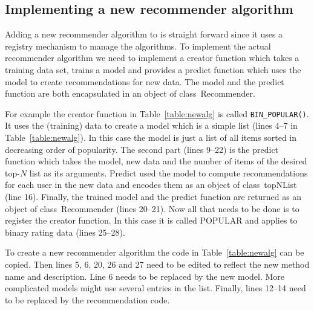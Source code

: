 \documentclass[nojss]{jss}
\newcommand{\class}[1]{\mbox{\textsf{#1}}}
\newcommand{\func}[1]{\mbox{\texttt{#1()}}}
\begin{document}

\subsection{Implementing a new recommender algorithm}

Adding a new recommender algorithm to  
is straight forward since
it uses a registry mechanism to manage the algorithms.
To implement the actual recommender algorithm
we need to implement a creator function which takes a training data set,
trains a model and provides a predict function which uses the
model to create recommendations for new data.
The model and the predict function are both encapsulated in an
object of class~\class{Recommender}. 

For example the creator function
in Table~\ref{table:newalg} is called \func{BIN\_POPULAR}. It uses 
the (training) data to create a model which is a simple list (lines 4--7 in
Table~\ref{table:newalg}). 
In this case the model is just a list of all items sorted in 
decreasing order of
popularity.
The second part (lines 9--22) is the predict function which 
takes the model, new data and
the number of items of the desired top-$N$ list as its arguments.
Predict used the model to compute recommendations for 
each user in the new data and
encodes them as an object of class~\class{topNList} (line 16).
Finally, the trained model and the predict function are returned as 
an object of class~\class{Recommender} (lines 20--21).
Now all that needs to be done is to register the creator function. In this case
it is called POPULAR and applies to binary rating data (lines 25--28).

To create a new recommender algorithm the code in Table~\ref{table:newalg}
can be copied. Then lines 5, 6, 20, 26 and 27 need 
to be edited to reflect the new method name and description.
Line 6 needs to be replaced by the new model. More complicated
models might use several entries in the list. Finally, 
lines 12--14 need to be replaced by the recommendation code.
\end{document}
